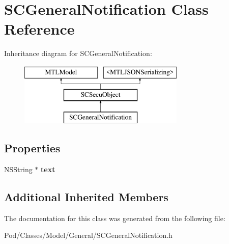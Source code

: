 \hypertarget{interface_s_c_general_notification}{}\section{S\+C\+General\+Notification Class Reference}
\label{interface_s_c_general_notification}
Inheritance diagram for S\+C\+General\+Notification\+:\begin{figure}[H]
\begin{center}
\leavevmode
\includegraphics[height=3.000000cm]{interface_s_c_general_notification}
\end{center}
\end{figure}
\subsection*{Properties}
\begin{DoxyCompactItemize}
\item 
N\+S\+String $\ast$ {\bfseries text}\hypertarget{interface_s_c_general_notification_a3f2b715c90deca844646dcc316ef1045}{}\label{interface_s_c_general_notification_a3f2b715c90deca844646dcc316ef1045}

\end{DoxyCompactItemize}
\subsection*{Additional Inherited Members}


The documentation for this class was generated from the following file\+:\begin{DoxyCompactItemize}
\item 
Pod/\+Classes/\+Model/\+General/S\+C\+General\+Notification.\+h\end{DoxyCompactItemize}
